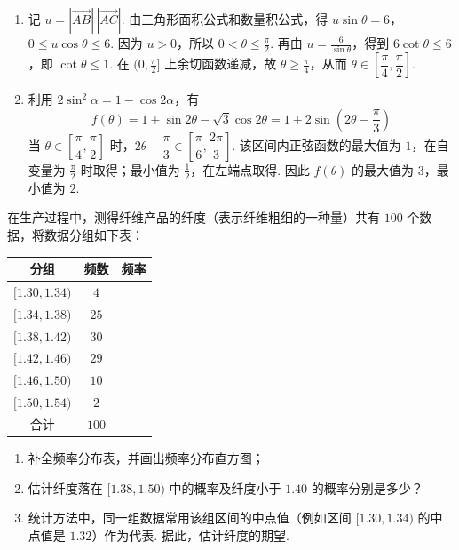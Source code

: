 \begin{solution}
\begin{enumerate}
\item 记 \(u=|\overrightarrow{AB}|\,|\overrightarrow{AC}|\). 由三角形面积公式和数量积公式，得
\(u\sin\theta=6\)，\(0\leqslant u\cos\theta\leqslant6\).
因为 \(u>0\)，所以 \(0<\theta\leqslant\frac{\pi}{2}\). 再由 \(u=\frac{6}{\sin\theta}\)，得到 \(6\cot\theta\leqslant6\)，即 \(\cot\theta\leqslant1\). 在 \((0,\frac{\pi}{2}]\) 上余切函数递减，故 \(\theta\geqslant\frac{\pi}{4}\)，从而 \(\theta\in\left[\dfrac{\pi}{4},\dfrac{\pi}{2}\right]\).
\item 利用 \(2\sin^2\alpha=1-\cos2\alpha\)，有
\[
f(\theta)=1+\sin2\theta-\sqrt3\cos2\theta=1+2\sin\left(2\theta-\frac{\pi}{3}\right)
\]
当 \(\theta\in\left[\dfrac{\pi}{4},\dfrac{\pi}{2}\right]\) 时，\(2\theta-\dfrac\pi3\in\left[\dfrac\pi6,\dfrac{2\pi}3\right]\). 该区间内正弦函数的最大值为 \(1\)，在自变量为 \(\frac{\pi}{2}\) 时取得；最小值为 \(\frac{1}{2}\)，在左端点取得. 因此 \(f(\theta)\) 的最大值为 \(3\)，最小值为 \(2\).
\end{enumerate}
\end{solution}

\begin{problem}
在生产过程中，测得纤维产品的纤度（表示纤维粗细的一种量）共有 \(100\) 个数据，将数据分组如下表：

\begin{center}
\small
\begin{tabular}{|c|c|c|}
\hline
分组 & 频数 & 频率 \\
\hline
\([1.30,1.34)\) & \(4\) & \\
\hline
\([1.34,1.38)\) & \(25\) & \\
\hline
\([1.38,1.42)\) & \(30\) & \\
\hline
\([1.42,1.46)\) & \(29\) & \\
\hline
\([1.46,1.50)\) & \(10\) & \\
\hline
\([1.50,1.54)\) & \(2\) & \\
\hline
合计 & \(100\) & \\
\hline
\end{tabular}
\end{center}

\begin{enumerate}
\item 补全频率分布表，并画出频率分布直方图；
\item 估计纤度落在 \([1.38, 1.50)\) 中的概率及纤度小于 \(1.40\) 的概率分别是多少？
\item 统计方法中，同一组数据常用该组区间的中点值（例如区间 \([1.30, 1.34)\) 的中点值是 \(1.32\)）作为代表. 据此，估计纤度的期望.
\end{enumerate}

\end{problem}

